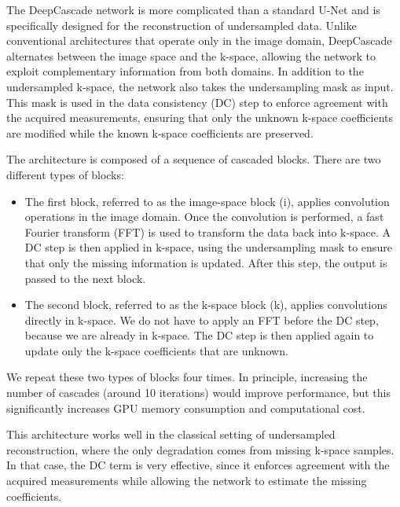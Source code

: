 \documentclass[12pt]{article}
\begin{document}
The DeepCascade network is more complicated than a standard U-Net and is specifically designed for the reconstruction of undersampled data. 
Unlike conventional architectures that operate only in the image domain, DeepCascade alternates between the image space and the k-space, allowing the network to exploit complementary information from both domains.
In addition to the undersampled k-space, the network also takes the undersampling mask as input.
This mask is used in the data consistency (DC) step to enforce agreement with the acquired measurements, ensuring that only the unknown k-space coefficients are modified while the known k-space coefficients are preserved.
\vspace{0.5cm}

The architecture is composed of a sequence of cascaded blocks.
There are two different types of blocks:

\begin{itemize}
    \item The first block, referred to as the image-space block (i), applies convolution operations in the image domain.
    Once the convolution is performed, a fast Fourier transform (FFT) is used to transform the data back into k-space.
    A DC step is then applied in k-space, using the undersampling mask to ensure that only the missing information is updated.
    After this step, the output is passed to the next block.
    \item The second block, referred to as the k-space block (k), applies convolutions directly in k-space.
    We do not have to apply an FFT before the DC step, because we are already in k-space.
    The DC step is then applied again to update only the k-space coefficients that are unknown.
\end{itemize}

We repeat these two types of blocks four times. 
In principle, increasing the number of cascades (around 10 iterations) would improve performance, but this significantly increases GPU memory consumption and computational cost.
\vspace{0.5cm}

This architecture works well in the classical setting of undersampled reconstruction, where the only degradation comes from missing k-space samples.
In that case, the DC term is very effective, since it enforces agreement with the acquired measurements while allowing the network to estimate the missing coefficients.
\vspace{0.5cm}
\end{document}
